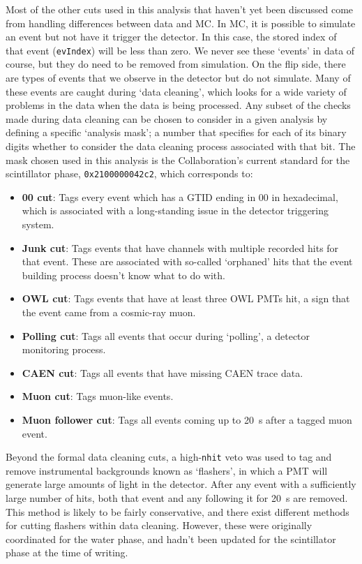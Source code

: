 Most of the other cuts used in this analysis that haven't yet been discussed come from handling differences between data and MC. In MC, it is possible to simulate an event but not have it trigger the detector. In this case, the stored index of that event (\texttt{evIndex}) will be less than zero. We never see these `events' in data of course, but they do need to be removed from simulation. On the flip side, there are types of events that we observe in the detector but do not simulate. Many of these events are caught during `data cleaning', which looks for a wide variety of problems in the data when the data is being processed. Any subset of the checks made during data cleaning can be chosen to consider in a given analysis by defining a specific `analysis mask'; a number that specifies for each of its binary digits whether to consider the data cleaning process associated with that bit. The mask chosen used in this analysis is the Collaboration's current standard for the scintillator phase, \texttt{0x2100000042c2}, which corresponds to:

\begin{itemize}
    \item \textbf{00 cut}: Tags every event which has a GTID ending in 00 in hexadecimal, which is associated with a long-standing issue in the detector triggering system.
    \item \textbf{Junk cut}: Tags events that have channels with multiple recorded hits for that event. These are associated with so-called `orphaned' hits that the event building process doesn't know what to do with.
    \item \textbf{OWL cut}: Tags events that have at least three OWL PMTs hit, a sign that the event came from a cosmic-ray muon.
    \item \textbf{Polling cut}: Tags all events that occur during `polling', a detector monitoring process.
    \item \textbf{CAEN cut}: Tags all events that have missing CAEN trace data.
    \item \textbf{Muon cut}: Tags muon-like events.
    \item \textbf{Muon follower cut}: Tags all events coming up to \SI{20}{\second} after a tagged muon event.
\end{itemize}

Beyond the formal data cleaning cuts, a high-\texttt{nhit} veto was used to tag and remove instrumental backgrounds known as `flashers', in which a PMT will generate large amounts of light in the detector. After any event with a sufficiently large number of hits, both that event and any following it for \SI{20}{\second} are removed. This method is likely to be fairly conservative, and there exist different methods for cutting flashers within data cleaning. However, these were originally coordinated for the water phase, and hadn't been updated for the scintillator phase at the time of writing.

